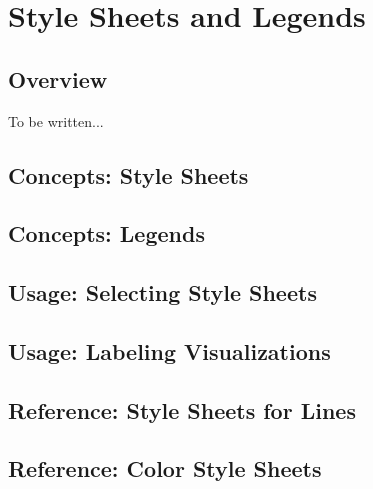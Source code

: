 %
%
%


\section{Style Sheets and Legends}
\label{section-dv-style-sheets}

\subsection{Overview}

To be written...

\subsection{Concepts: Style Sheets}

\subsection{Concepts: Legends}

\subsection{Usage: Selecting Style Sheets}

\subsection{Usage: Labeling Visualizations}

\subsection{Reference: Style Sheets for Lines}

\subsection{Reference: Color Style Sheets}

